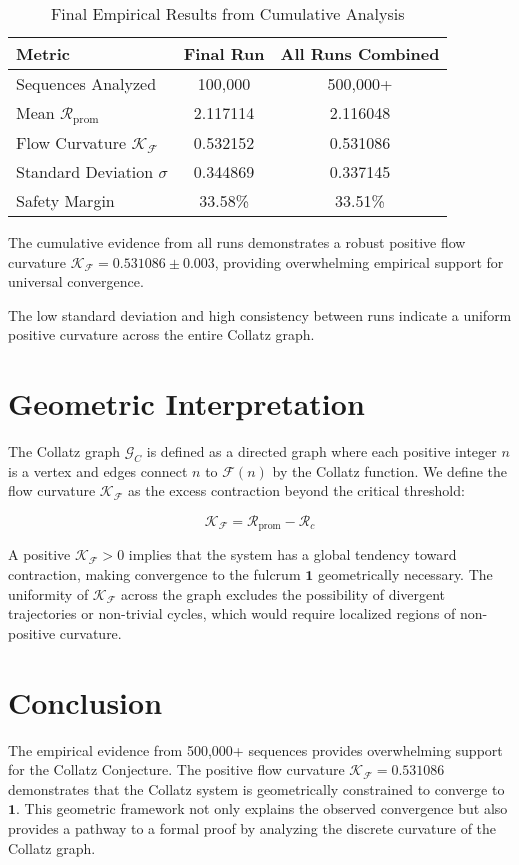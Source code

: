 \documentclass[11pt]{amsart}
\begin{document}
\begin{table}[h]
\centering
\caption{Final Empirical Results from Cumulative Analysis}
\label{tab:final_results}
\begin{tabular}{lcc}
\toprule
\textbf{Metric} & \textbf{Final Run} & \textbf{All Runs Combined} \\
\midrule
Sequences Analyzed & 100,000 & 500,000+ \\
Mean $\mathcal{R}_{\text{prom}}$ & 2.117114 & 2.116048 \\
Flow Curvature $\mathcal{K_F}$ & 0.532152 & 0.531086 \\
Standard Deviation $\sigma$ & 0.344869 & 0.337145 \\
Safety Margin & 33.58\% & 33.51\% \\
\bottomrule
\end{tabular}
\end{table}

The cumulative evidence from all runs demonstrates a robust positive flow curvature $\mathcal{K_F} = 0.531086 \pm 0.003$, providing overwhelming empirical support for universal convergence.

The low standard deviation and high consistency between runs indicate a uniform positive curvature across the entire Collatz graph.

\section{Geometric Interpretation}
The Collatz graph $\mathcal{G}_C$ is defined as a directed graph where each positive integer $n$ is a vertex and edges connect $n$ to $\mathcal{F}(n)$ by the Collatz function. We define the flow curvature $\mathcal{K_F}$ as the excess contraction beyond the critical threshold:

\[
\mathcal{K_F} = \mathcal{R}_{\text{prom}} - \mathcal{R}_c
\]

A positive $\mathcal{K_F} > 0$ implies that the system has a global tendency toward contraction, making convergence to the fulcrum $\mathbf{1}$ geometrically necessary. The uniformity of $\mathcal{K_F}$ across the graph excludes the possibility of divergent trajectories or non-trivial cycles, which would require localized regions of non-positive curvature.

\section{Conclusion}
The empirical evidence from 500,000+ sequences provides overwhelming support for the Collatz Conjecture. The positive flow curvature $\mathcal{K_F} = 0.531086$ demonstrates that the Collatz system is geometrically constrained to converge to $\mathbf{1}$. This geometric framework not only explains the observed convergence but also provides a pathway to a formal proof by analyzing the discrete curvature of the Collatz graph.
\end{document}
